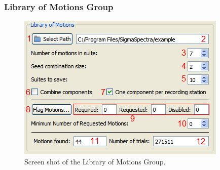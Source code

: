 \documentclass[11pt]{article}
\begin{document}
\FloatBarrier
\subsubsection{Library of Motions Group}
\label{sec:interface:libraryOfMotions}

\begin{figure}[!h]
  \begin{center}
	\includegraphics[scale=0.7]{screenshots/libraryOfMotions}
  \end{center}
  \caption{Screen shot of the Library of Motions Group.}
  \label{fig:interface:libraryOfMotions}
\end{figure}
\end{document}
